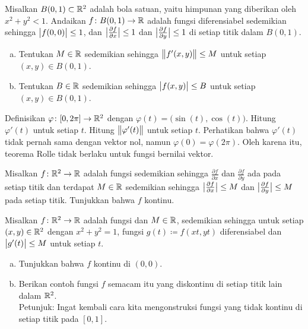 \begin{exercise}
Misalkan $B(0,1) \subset {\mathbb{R}}^2$ adalah bola satuan, yaitu himpunan yang diberikan oleh
$x^2 + y^2 < 1$.
Andaikan $f \colon B(0,1) \to {\mathbb{R}}$ adalah fungsi diferensiabel
sedemikian sehingga $\bigl\lvert {f(0,0)} \bigr\rvert \leq 1$,
dan 
$\bigl\lvert {\frac{\partial f}{\partial x}} \bigr\rvert \leq 1$ dan
$\bigl\lvert {\frac{\partial f}{\partial y}} \bigr\rvert \leq 1$ di setiap
titik dalam $B(0,1)$.
\begin{enumerate}[a)]
\item
Tentukan $M \in {\mathbb{R}}$ sedemikian sehingga $\bigl\lVert {f'(x,y)} \bigr\rVert \leq M$
untuk setiap $(x,y) \in
B(0,1)$.
\item
Tentukan $B \in {\mathbb{R}}$ sedemikian sehingga
$\bigl\lvert {f(x,y)} \bigr\rvert \leq B$
untuk setiap $(x,y) \in
B(0,1)$.
\end{enumerate}
\end{exercise}

\begin{exercise}
Definisikan $\varphi \colon [0,2\pi] \to {\mathbb{R}}^2$ dengan $\varphi(t) =
\bigl(\sin(t),\cos(t)\bigr)$.  Hitung $\varphi'(t)$ untuk setiap $t$.  Hitung
$\bigl\lVert {\varphi'(t)} \bigr\rVert$ untuk setiap $t$.  Perhatikan bahwa $\varphi'(t)$ tidak pernah sama dengan vektor nol,
namun $\varphi(0) = \varphi(2\pi)$.  Oleh karena itu, teorema Rolle tidak berlaku
untuk fungsi bernilai vektor.
\end{exercise}

\begin{exercise}
Misalkan $f \colon {\mathbb{R}}^2 \to {\mathbb{R}}$ adalah fungsi sedemikian sehingga
$\frac{\partial f}{\partial x}$ dan
$\frac{\partial f}{\partial y}$ ada pada setiap titik dan terdapat $M
\in {\mathbb{R}}$
sedemikian sehingga 
$\bigl\lvert {\frac{\partial f}{\partial x}} \bigr\rvert \leq M$ dan
$\bigl\lvert {\frac{\partial f}{\partial y}} \bigr\rvert \leq M$ pada setiap titik.  Tunjukkan bahwa $f$
kontinu.
\end{exercise}

\begin{samepage}
\begin{exercise}
Misalkan $f \colon {\mathbb{R}}^2 \to {\mathbb{R}}$ adalah fungsi dan
$M \in {\mathbb{R}}$, sedemikian sehingga
untuk setiap $(x,y) \in {\mathbb{R}}^2$ dengan $x^2+y^2=1$, fungsi $g(t) \coloneqq f(xt,yt)$
diferensiabel
dan $\bigl\lvert {g'(t)} \bigr\rvert \leq M$ untuk setiap $t$.
\begin{enumerate}[a)]
\item
Tunjukkan bahwa $f$ kontinu di $(0,0)$.
\item
Berikan contoh fungsi $f$ semacam itu yang diskontinu di setiap titik lain dalam
${\mathbb{R}}^2$.\\
Petunjuk: Ingat kembali cara kita mengonstruksi fungsi yang tidak kontinu di setiap titik pada $[0,1]$.
\end{enumerate}
\end{exercise}
\end{samepage}

